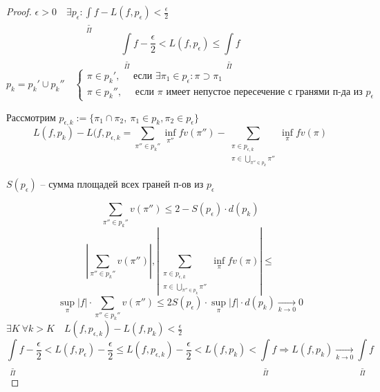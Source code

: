     \begin{proof}
        $\epsilon > 0 \quad \exists p_\epsilon : \underset{\Pi}{\underline{\int}} f - L(f, p_\epsilon) < \frac \epsilon 2$
        \[
            \underset{\Pi}{\underline{\int}} f - \frac{\epsilon}{2} < L(f, p_\epsilon) \le \underset{\Pi}{\underline{\int}} f    
        \]
        $p_k = p_k' \cup p_k'' \quad \begin{cases}
            \pi \in p_k', \quad \text{ если } \exists \pi_1 \in p_\epsilon : \pi \supset \pi_1 \\ %
            \pi \in p_k'', \quad \text{ если } \pi \text{ имеет непустое пересечение с гранями п-да из } p_\epsilon
        \end{cases}$
        \par Рассмотрим $p_{\epsilon, k} := \{\pi_1 \cap \pi_2, \ \pi_1 \in p_k, \pi_2 \in p_\epsilon\}$
        \[
            L(f,p_k) - L(f, p_{\epsilon, k} = \sum_{\pi'' \in p_k''} \inf_{\pi''} f v(\pi'') - \sum_{\begin{split}
                \pi \in p_{\epsilon, k} \\
                \pi \in \bigcup_{\pi'' \in p_k} \pi''
            \end{split}} \inf_\pi f v(\pi) %
        \]

        $S(p_\epsilon)$ -- сумма площадей всех граней п-ов из $p_\epsilon$
        
        \[
            \sum_{\pi'' \in p_k''} v(\pi'') \le 2 - S(p_\epsilon) \cdot d(p_k) %
        \]
        \[
            \left|\sum_{\pi'' \in p_k''} v(\pi'')\right|, \left|\sum_{\begin{split}
                \pi \in p_{\epsilon, k} \\
                \pi \in \bigcup_{\pi'' \in p_k} \pi''
            \end{split}} \inf_\pi f v(\pi) \right| \le
        \]
        \[
            \sup_\pi |f| \cdot \sum_{\pi'' \in p_k''} v(\pi'') \le 2S(p_\epsilon) \cdot \sup_\pi |f| \cdot d(p_k) \xrightarrow[k \rightarrow 0]{} 0   
        \]
        $\exists K \ \forall k > K \quad L(f, p_{\epsilon, k}) - L(f, p_k) < \frac \epsilon 2$
        \[
            \underset{\Pi}{\underline{\int}} f - \frac \epsilon 2 < L(f, p_\epsilon) - \frac \epsilon 2 \le L(f, p_{\epsilon, k}) - \frac \epsilon 2 < L(f, p_k) < \underset{\Pi}{\underline{\int}} f \Rightarrow L(f, p_k) \xrightarrow[k \rightarrow 0]{} \underset{\Pi}{\underline{\int}} f
        \]
    \end{proof}

